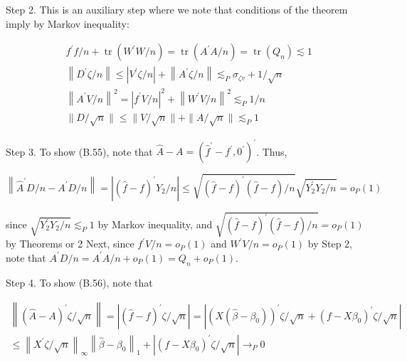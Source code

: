 \documentclass[10pt]{article}
\begin{document}
Step 2. This is an auxiliary step where we note that conditions of the theorem imply by Markov inequality:

\[
\begin{aligned}
& f^{\prime} f / n+\operatorname{tr}\left(W^{\prime} W / n\right)=\operatorname{tr}\left(A^{\prime} A / n\right)=\operatorname{tr}\left(Q_{n}\right) \lesssim 1 \\
& \left\|D^{\prime} \zeta / n\right\| \leqslant\left|V^{\prime} \zeta / n\right|+\left\|A^{\prime} \zeta / n\right\| \lesssim_{P} \sigma_{\zeta v}+1 / \sqrt{n} \\
& \left\|A^{\prime} V / n\right\|^{2}=\left|f^{\prime} V / n\right|^{2}+\left\|W^{\prime} V / n\right\|^{2} \lesssim_{P} 1 / n \\
& \|D / \sqrt{n}\| \leqslant\|V / \sqrt{n}\|+\|A / \sqrt{n}\| \lesssim_{P} 1
\end{aligned}
\]

Step 3. To show (B.55), note that \(\widehat{A}-A=\left(\hat{f}^{\prime}-f^{\prime}, 0^{\prime}\right)^{\prime}\). Thus,

\[
\left\|\widehat{A}^{\prime} D / n-A^{\prime} D / n\right\|=\left|(\widehat{f}-f)^{\prime} Y_{2} / n\right| \leqslant \sqrt{(\widehat{f}-f)^{\prime}(\widehat{f}-f) / n} \sqrt{Y_{2}^{\prime} Y_{2} / n}=o_{P}(1)
\]

since \(\sqrt{Y_{2}^{\prime} Y_{2} / n} \lesssim_{P} 1\) by Markov inequality, and \(\sqrt{(\widehat{f}-f)^{\prime}(\widehat{f}-f) / n}=o_{P}(1)\) by Theorems or 2 Next, since \(f^{\prime} V / n=o_{P}(1)\) and \(W^{\prime} V / n=o_{P}(1)\) by Step 2, note that \(A^{\prime} D / n=A^{\prime} A / n+o_{P}(1)=Q_{n}+o_{P}(1)\).

Step 4. To show (B.56), note that

\[
\begin{gathered}
\left\|(\widehat{A}-A)^{\prime} \zeta / \sqrt{n}\right\|=\left|(\widehat{f}-f)^{\prime} \zeta / \sqrt{n}\right|=\left|\left(X\left(\widehat{\beta}-\beta_{0}\right)\right)^{\prime} \zeta / \sqrt{n}+\left(f-X \beta_{0}\right)^{\prime} \zeta / \sqrt{n}\right| \\
\leqslant\left\|X^{\prime} \zeta / \sqrt{n}\right\|_{\infty}\left\|\widehat{\beta}-\beta_{0}\right\|_{1}+\left|\left(f-X \beta_{0}\right)^{\prime} \zeta / \sqrt{n}\right| \rightarrow_{P} 0
\end{gathered}
\]
\end{document}
